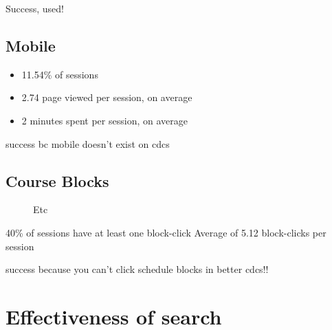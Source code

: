 Success, used!

\subsection{Mobile}

\begin{itemize}
  \item 11.54\% of sessions
  \item 2.74 page viewed per session, on average
  \item 2 minutes spent per session, on average
\end{itemize}

success bc mobile doesn't exist on cdcs

\subsection{Course Blocks}

\begin{figure}
  \centering


  \caption{Etc}
  \label{fig:searchtypes}

\end{figure}

40\% of sessions have at least one block-click
Average of 5.12 block-clicks per session

success because you can't click schedule blocks in better cdcs!!

\section{Effectiveness of search}

